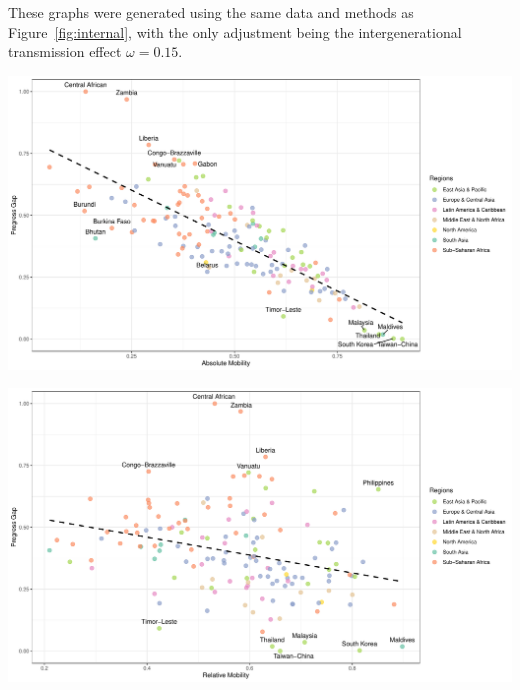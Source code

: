 
\begin{flushleft}
These graphs were generated using the same data and methods as Figure~\ref{fig:internal}, with the only adjustment being the intergenerational transmission effect \(\omega = 0.15\).
\end{flushleft}

\includegraphics[width=1\linewidth]{figs/abs_pro2.pdf}

\includegraphics[width=1\linewidth]{figs/rel_pro2.pdf}


